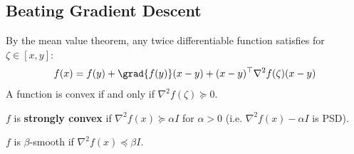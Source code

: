 \subsection{Beating Gradient Descent}
By the mean value theorem, any twice differentiable
function satisfies for $\zeta \in [x, y]$:
\[ f(x) = f(y) + \grad{f(y)}(x-y) + (x-y)^{\top} \nabla^2 f (\zeta) (x - y) \]
A function is convex if and only if $\nabla^2 f(\zeta) \succeq 0$.
\begin{definition}
    $f$ is \textbf{strongly convex} if $\nabla^2 f(x) \succeq \alpha I$ for $\alpha > 0$ (i.e. $\nabla^2 f(x)  - \alpha I$ is PSD).
\end{definition}

\begin{definition}
    $f$ is $\beta$-smooth if $\nabla^2 f(x) \preceq \beta I$.
\end{definition}